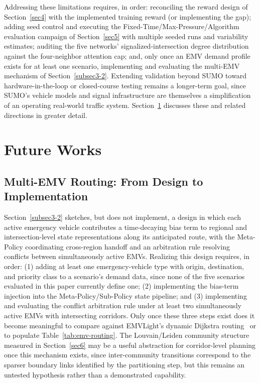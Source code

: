 \documentclass[3p,times]{elsarticle}
\theoremstyle{plain}
\theoremstyle{definition}
\begin{document}
Addressing these limitations requires, in order: reconciling the
reward design of Section~\ref{sec4} with the implemented training
reward (or implementing the gap); adding seed control and executing
the Fixed-Time/Max-Pressure/Algorithm evaluation campaign of
Section~\ref{sec5} with multiple seeded runs and variability estimates;
auditing the five networks' signalized-intersection degree distribution
against the four-neighbor attention cap; and, only once an EMV
demand profile exists for at least one scenario, implementing and
evaluating the multi-EMV mechanism of Section~\ref{subsec3-2}.
Extending validation beyond SUMO toward hardware-in-the-loop or
closed-course testing remains a longer-term goal, since SUMO's vehicle
models and signal infrastructure are themselves a simplification of an
operating real-world traffic system. Section~\ref{sec8} discusses these
and related directions in greater detail.



\section{Future Works}\label{sec8}

\subsection{Multi-EMV Routing: From Design to Implementation}

Section~\ref{subsec3-2} sketches, but does not implement, a design in
which each active emergency vehicle contributes a time-decaying bias
term to regional and intersection-level state representations along
its anticipated route, with the Meta-Policy coordinating cross-region
handoff and an arbitration rule resolving conflicts between
simultaneously active EMVs. Realizing this design requires, in order:
(1) adding at least one emergency-vehicle type with origin,
destination, and priority class to a scenario's demand data, since none
of the five scenarios evaluated in this paper currently define one; (2)
implementing the bias-term injection into the Meta-Policy/Sub-Policy
state pipeline; and (3) implementing and evaluating the conflict
arbitration rule under at least two simultaneously active EMVs with
intersecting corridors. Only once these three steps exist does it
become meaningful to compare against EMVLight's dynamic Dijkstra
routing~\cite{emvlight} or to populate Table~\ref{tab:emv-routing}. The
Louvain/Leiden community structure measured in Section~\ref{sec6} may
be a useful abstraction for corridor-level planning once this mechanism
exists, since inter-community transitions correspond to the sparser
boundary links identified by the partitioning step, but this remains an
untested hypothesis rather than a demonstrated capability.
\end{document}
